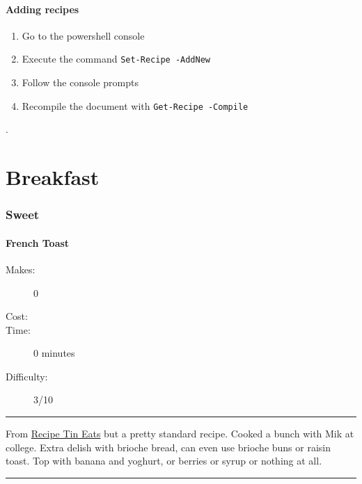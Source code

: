 \documentclass[]{article}
\begin{document}
\subsection*{\huge Adding recipes}

\begin{enumerate}
\item Go to the powershell console
\item Execute the command \texttt{\color{accent}Set-Recipe -AddNew}
\item Follow the console prompts
\item Recompile the document with \texttt{\color{accent}Get-Recipe -Compile}
\end{enumerate}

\newpage
\color{white}.\color{black}
\vspace{5cm}
\part{\Huge Breakfast}
\newpage
{}
\section*{\center\Huge\color{accent}Sweet}
\label{cat:Sweet}
\label{rec:French Toast}
\subsection*{\center\huge French Toast}
\begin{description}
\item[Makes:] 0 
\item[Cost:] \textdollar
\item[Time:] 0 minutes
\item[Difficulty:] 3/10
\end{description}
\vspace{0.2cm}\hrule\vspace{0.5cm}
\begin{adjustwidth}{0.5 cm}{0.5 cm}

From \href{https://www.recipetineats.com/wprm_print/26510}{Recipe Tin Eats} but a pretty standard recipe. Cooked a bunch with Mik at college. Extra delish with brioche bread, can even use brioche buns or raisin toast. Top with banana and yoghurt, or berries or syrup or nothing at all. \hfill{}\color{black}

\end{adjustwidth}
\vspace{0.5cm}\hrule
\end{document}
